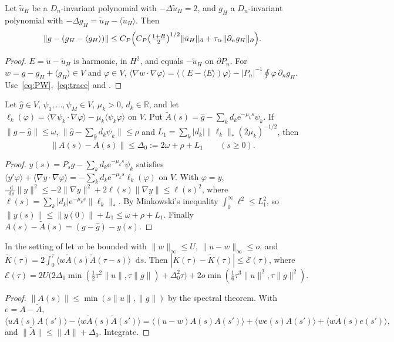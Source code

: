 \documentclass[11pt,a4paper]{report}
\DeclareRobustCommand*{\avg}[1]{\langle #1\rangle}
\DeclareRobustCommand*{\norm}[1]{\lVert #1\rVert}
\DeclareRobustCommand*{\bdnorm}[1]{\lVert #1\rVert_{\partial}}
\DeclareRobustCommand*{\dualnorm}[1]{\lVert #1\rVert_{*}}
\DeclareRobustCommand*{\ut}{\tilde u}
\DeclareRobustCommand*{\dd}{\mathop{}\!\mathrm{d}}
\DeclareRobustCommand*{\Pg}{P_n}
\begin{document}
\begin{lemma}[note=cell problem]\label{lem:cell}
Let \(\ut_H\) be a \(D_n\)-invariant polynomial with \(-\Delta\ut_H=2\), and \(g_H\) a \(D_n\)-invariant polynomial with
\(-\Delta g_H=\ut_H-\avg{\ut_H}\). Then
\[
\norm{g-(g_H-\avg{g_H})}\le C_P\Bigl(C_P\bigl(\tfrac{1+R}2\bigr)^{1/2}\bdnorm{\ut_H}+\tau_{\mathrm{tr}}\bdnorm{\partial_ng_H}\Bigr).
\]
\end{lemma}
\begin{proof}
\(E=\ut-\ut_H\) is harmonic, in \(H^2\), and equals \(-\ut_H\) on \(\partial\Pg\). For \(w=g-g_H+\avg{g_H}\in V\) and \(\varphi\in V\),
\(\avg{\nabla w\cdot\nabla\varphi}=\avg{(E-\avg E)\varphi}-|\Pg|^{-1}\oint\varphi\,\partial_ng_H\). Use~\eqref{eq:PW},~\eqref{eq:trace} and
.
\end{proof}

\begin{lemma}[note=modal approximation of \(A\)]\label{lem:modal}
Let \(\hat g\in V\), \(\psi_1,\dots,\psi_M\in V\), \(\mu_k>0\), \(d_k\in\mathbb R\), and let
\(\ell_k(\varphi)=\avg{\nabla\psi_k\cdot\nabla\varphi}-\mu_k\avg{\psi_k\varphi}\) on \(V\). Put
\(\tilde A(s)=\hat g-\sum_kd_k\mathrm e^{-\mu_ks}\psi_k\). If \(\norm{g-\hat g}\le\omega\), \(\norm{\hat g-\sum_kd_k\psi_k}\le\rho\) and
\(L_1=\sum_k|d_k|\dualnorm{\ell_k}(2\mu_k)^{-1/2}\), then
\[
\norm{A(s)-\tilde A(s)}\le\Delta_0:=2\omega+\rho+L_1\qquad(s\ge0).
\]
\end{lemma}
\begin{proof}
\(y(s)=P_sg-\sum_kd_k\mathrm e^{-\mu_ks}\psi_k\) satisfies \(\avg{y'\varphi}+\avg{\nabla y\cdot\nabla\varphi}=-\sum_kd_k\mathrm e^{-\mu_ks}\ell_k(\varphi)\)
on \(V\). With \(\varphi=y\), \(\frac{\dd}{\dd s}\norm y^2\le-2\norm{\nabla y}^2+2\ell(s)\norm{\nabla y}\le\ell(s)^2\), where
\(\ell(s)=\sum_k|d_k|\mathrm e^{-\mu_ks}\dualnorm{\ell_k}\). By Minkowski's inequality \(\int_0^\infty\ell^2\le L_1^2\), so
\(\norm{y(s)}\le\norm{y(0)}+L_1\le\omega+\rho+L_1\). Finally \(A(s)-\tilde A(s)=(g-\hat g)-y(s)\).
\end{proof}

\begin{lemma}[note=comparison]\label{lem:compare}
In the setting of  let \(w\) be bounded with \(\norm w_\infty\le U\), \(\norm{u-w}_\infty\le o\), and
\(\tilde K(\tau)=2\int_0^\tau\avg{w\tilde A(s)\tilde A(\tau-s)}\dd s\). Then \(|K(\tau)-\tilde K(\tau)|\le\mathcal E(\tau)\), where
\[
\mathcal E(\tau)=2U\bigl(2\Delta_0\min(\tfrac12\tau^2\norm u,\tau\norm g)+\Delta_0^2\tau\bigr)+2o\min(\tfrac16\tau^3\norm u^2,\tau\norm g^2).
\]
\end{lemma}
\begin{proof}
\(\norm{A(s)}\le\min(s\norm u,\norm g)\) by the spectral theorem. With \(e=A-\tilde A\),
\[
\avg{uA(s)A(s')}-\avg{w\tilde A(s)\tilde A(s')}=\avg{(u-w)A(s)A(s')}+\avg{we(s)A(s')}+\avg{w\tilde A(s)e(s')},
\]
and \(\norm{\tilde A}\le\norm A+\Delta_0\). Integrate.
\end{proof}
\end{document}
